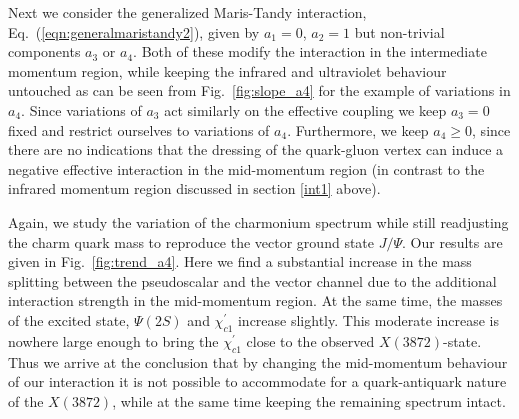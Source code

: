 Next we consider the generalized Maris-Tandy interaction, Eq.~(\ref{eqn:generalmaristandy2}), 
given by $a_1=0$, $a_2=1$ but non-trivial components $a_3$ or $a_4$. Both of these modify 
the interaction in the intermediate momentum region, while keeping the infrared and
ultraviolet behaviour untouched as can be seen from Fig.~\ref{fig:slope_a4} for the 
example of variations in $a_4$. Since variations of $a_3$ act similarly on the effective
coupling we keep $a_3=0$ fixed and restrict ourselves to variations of $a_4$.
Furthermore, we keep $a_4 \ge 0$, since there are no indications that the dressing of the
quark-gluon vertex can induce a negative effective interaction in the mid-momentum region
(in contrast to the infrared momentum region discussed in section \ref{int1} above).

Again, we study the variation of the charmonium spectrum while still readjusting
the charm quark mass to reproduce the vector ground state $J/\Psi$. Our results
are given in Fig.~\ref{fig:trend_a4}. Here we find a substantial increase in the
mass splitting between the pseudoscalar and the vector channel due to the additional
interaction strength in the mid-momentum region. At the same time, the masses of the
excited state, $\Psi(2S)$ and $\chi_{c1}^{\prime}$ increase slightly. This moderate increase 
is nowhere large enough to bring the $\chi_{c1}^{\prime}$ close to the observed $X(3872)$-state.
Thus we arrive at the conclusion that by changing the mid-momentum behaviour of our 
interaction it is not possible to accommodate for a quark-antiquark nature of the 
$X(3872)$, while at the same time keeping the remaining spectrum intact.
%
%
%
%
%
%
%
%
%

